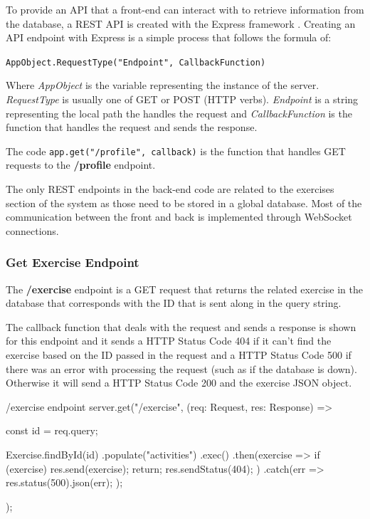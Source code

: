 To provide an API that a front-end can interact with to retrieve information from the database, a REST API is created with the Express framework \cite{express}. Creating an API endpoint with Express is a simple process that follows the formula of:

\texttt{AppObject.RequestType("Endpoint", CallbackFunction)}

Where \textit{AppObject} is the variable representing the instance of the server. \textit{RequestType} is usually one of GET or POST (HTTP verbs). \textit{Endpoint} is a string representing the local path the handles the request and \textit{CallbackFunction} is the function that handles the request and sends the response.

The code \texttt{app.get("/profile", callback)} is the function that handles GET requests to the \textbf{/profile} endpoint. 

The only REST endpoints in the back-end code are related to the exercises section of the system as those need to be stored in a global database. Most of the communication between the front and back is implemented through WebSocket connections.

\subsubsection{Get Exercise Endpoint}

The \textbf{/exercise} endpoint is a GET request that returns the related exercise in the database that corresponds with the ID that is sent along in the query string.

The callback function that deals with the request and sends a response is shown for this endpoint and it sends a HTTP Status Code 404 if it can't find the exercise based on the ID passed in the request and a HTTP Status Code 500 if there was an error with processing the request (such as if the database is down). Otherwise it will send a HTTP Status Code 200 and the exercise JSON object.

\begin{sexylisting}{/exercise endpoint}
server.get("/exercise", (req: Request, res: Response) => {
    const { id } = req.query;

    Exercise.findById(id)
        .populate("activities")
        .exec()
        .then(exercise => {
            if (exercise) {
                res.send(exercise);
                return;
            }
            res.sendStatus(404);
        })
        .catch(err => {
            res.status(500).json(err);
        });
});
\end{sexylisting}

